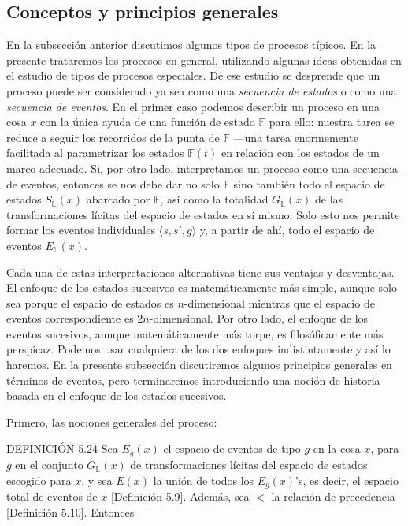 \begin{justifying}
    \subsection{Conceptos y principios generales}
    \noindent En la subsección anterior discutimos algunos tipos de procesos típicos. 
    En la presente trataremos los procesos en general, utilizando algunas ideas 
    obtenidas en el estudio de tipos de procesos especiales. De ese estudio se 
    desprende que un proceso puede ser considerado ya sea como una \textit{secuencia 
    de estados} o como una \textit{secuencia de eventos}. En el primer caso podemos 
    describir un proceso en una cosa $x$ con la única ayuda de una función de estado 
    $\mathbb{F}$ para ello: nuestra tarea se reduce a seguir los recorridos de la 
    punta de $\mathbb{F}$ ---una tarea enormemente facilitada al parametrizar los 
    estados $\mathbb{F}(t)$ en relación con los estados de un marco adecuado. Si, 
    por otro lado, interpretamos un proceso como una secuencia de eventos, entonces 
    se nos debe dar no solo $\mathbb{F}$ sino también todo el espacio de estados 
    $S_{\mathbb{L}}(x)$ abarcado por $\mathbb{F}$, así como la totalidad $G_{\mathbb{L}}(x)$ de 
    las transformaciones lícitas del espacio de estados en sí mismo. Solo esto 
    nos permite formar los eventos individuales $\langle s, s', g \rangle$ y, a 
    partir de ahí, todo el espacio de eventos $E_{\mathbb{L}}(x)$.

    Cada una de estas interpretaciones alternativas tiene sus ventajas y desventajas. 
    El enfoque de los estados sucesivos es matemáticamente más simple, aunque solo 
    sea porque el espacio de estados es $n$-dimensional mientras que el espacio 
    de eventos correspondiente es $2n$-dimensional. Por otro lado, el enfoque 
    de los eventos sucesivos, aunque matemáticamente más torpe, es filosóficamente 
    más perspicaz. Podemos usar cualquiera de los dos enfoques indistintamente y 
    así lo haremos. En la presente subsección discutiremos algunos principios 
    generales en términos de eventos, pero terminaremos introduciendo una noción 
    de historia basada en el enfoque de los estados sucesivos.

    Primero, las nociones generales del proceso:

    \bigskip

    \noindent DEFINICIÓN 5.24 Sea $E_g(x)$ el espacio de eventos de tipo 
    $g$ en la cosa $x$, para $g$ en el conjunto $G_{\mathbb{L}}(x)$ de transformaciones 
    lícitas del espacio de estados escogido para $x$, y sea $E(x)$ la unión de 
    todos los $E_g(x)$'s, es decir, el espacio total de eventos de $x$ 
    [Definición 5.9]. Además, sea $<$ la relación de precedencia [Definición 5.10]. 
    Entonces 
    

\end{justifying}
